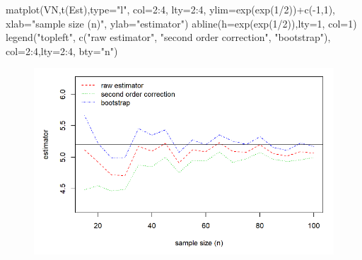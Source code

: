 \documentclass[
]{book}
\newenvironment{Shaded}{\begin{snugshade}}{\end{snugshade}}
\newcommand{\AttributeTok}[1]{\textcolor[rgb]{0.77,0.63,0.00}{#1}}
\newcommand{\DecValTok}[1]{\textcolor[rgb]{0.00,0.00,0.81}{#1}}
\newcommand{\FunctionTok}[1]{\textcolor[rgb]{0.00,0.00,0.00}{#1}}
\newcommand{\NormalTok}[1]{#1}
\newcommand{\SpecialCharTok}[1]{\textcolor[rgb]{0.00,0.00,0.00}{#1}}
\newcommand{\StringTok}[1]{\textcolor[rgb]{0.31,0.60,0.02}{#1}}
\begin{document}
\begin{Shaded}
\begin{Highlighting}[]
\FunctionTok{matplot}\NormalTok{(VN,}\FunctionTok{t}\NormalTok{(Est),}\AttributeTok{type=}\StringTok{"l"}\NormalTok{, }\AttributeTok{col=}\DecValTok{2}\SpecialCharTok{:}\DecValTok{4}\NormalTok{, }\AttributeTok{lty=}\DecValTok{2}\SpecialCharTok{:}\DecValTok{4}\NormalTok{, }\AttributeTok{ylim=}\FunctionTok{exp}\NormalTok{(}\FunctionTok{exp}\NormalTok{(}\DecValTok{1}\SpecialCharTok{/}\DecValTok{2}\NormalTok{))}\SpecialCharTok{+}\FunctionTok{c}\NormalTok{(}\SpecialCharTok{{-}}\DecValTok{1}\NormalTok{,}\DecValTok{1}\NormalTok{),}
        \AttributeTok{xlab=}\StringTok{"sample size (n)"}\NormalTok{, }\AttributeTok{ylab=}\StringTok{"estimator"}\NormalTok{)}
\FunctionTok{abline}\NormalTok{(}\AttributeTok{h=}\FunctionTok{exp}\NormalTok{(}\FunctionTok{exp}\NormalTok{(}\DecValTok{1}\SpecialCharTok{/}\DecValTok{2}\NormalTok{)),}\AttributeTok{lty=}\DecValTok{1}\NormalTok{, }\AttributeTok{col=}\DecValTok{1}\NormalTok{)}
\FunctionTok{legend}\NormalTok{(}\StringTok{"topleft"}\NormalTok{, }\FunctionTok{c}\NormalTok{(}\StringTok{"raw estimator"}\NormalTok{, }\StringTok{"second order correction"}\NormalTok{, }\StringTok{"bootstrap"}\NormalTok{),}
       \AttributeTok{col=}\DecValTok{2}\SpecialCharTok{:}\DecValTok{4}\NormalTok{,}\AttributeTok{lty=}\DecValTok{2}\SpecialCharTok{:}\DecValTok{4}\NormalTok{, }\AttributeTok{bty=}\StringTok{"n"}\NormalTok{)}
\end{Highlighting}
\end{Shaded}

\begin{figure}

{\centering \includegraphics[width=1\linewidth]{images/6.2.2-3} 

}

\end{figure}
\end{document}
